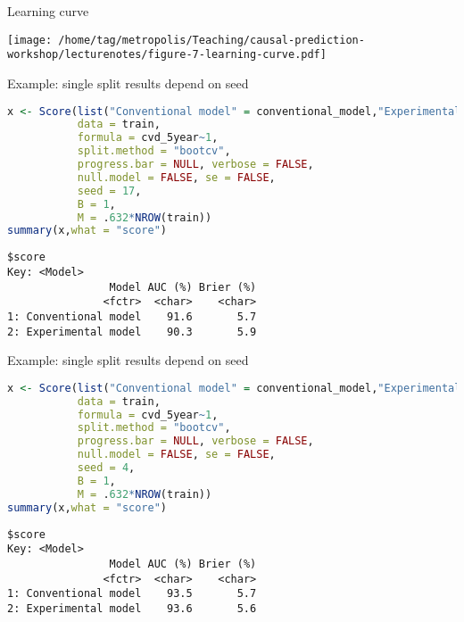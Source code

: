 \documentclass{beamer}\usepackage{listings}
\begin{document}
\begin{frame}[label={sec:orge84b5be}]{Learning curve}
\vspace{-3em}

\begin{center}
\texttt{[image: /home/tag/metropolis/Teaching/causal-prediction-workshop/lecturenotes/figure-7-learning-curve.pdf]}
\end{center}
\end{frame}
\begin{frame}[label={sec:orgd7e5720},fragile]{Example: single split results depend on seed}
 \begin{lstlisting}[language=r,numbers=none,otherkeywords={seed,train,method,B,M}, deletekeywords={model,family,se,null,data,formula}]
x <- Score(list("Conventional model" = conventional_model,"Experimental model" = experimental_model),
           data = train,
           formula = cvd_5year~1,
           split.method = "bootcv",
           progress.bar = NULL, verbose = FALSE,
           null.model = FALSE, se = FALSE,
           seed = 17,
           B = 1,
           M = .632*NROW(train))
summary(x,what = "score")
\end{lstlisting}

\label{}
\begin{verbatim}
$score
Key: <Model>
                Model AUC (%) Brier (%)
               <fctr>  <char>    <char>
1: Conventional model    91.6       5.7
2: Experimental model    90.3       5.9
\end{verbatim}
\end{frame}
\begin{frame}[label={sec:orge1c7927},fragile]{Example: single split results depend on seed}
 \begin{lstlisting}[language=r,numbers=none,otherkeywords={seed,train,method,B,M}, deletekeywords={model,family,se,null,data,formula}]
x <- Score(list("Conventional model" = conventional_model,"Experimental model" = experimental_model),
           data = train,
           formula = cvd_5year~1,
           split.method = "bootcv",
           progress.bar = NULL, verbose = FALSE,
           null.model = FALSE, se = FALSE,
           seed = 4,
           B = 1,
           M = .632*NROW(train))
summary(x,what = "score")
\end{lstlisting}

\label{}
\begin{verbatim}
$score
Key: <Model>
                Model AUC (%) Brier (%)
               <fctr>  <char>    <char>
1: Conventional model    93.5       5.7
2: Experimental model    93.6       5.6
\end{verbatim}
\end{frame}
\end{document}
